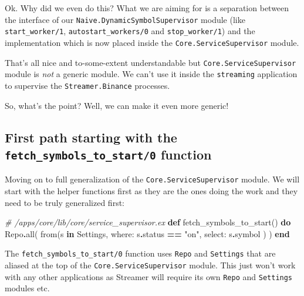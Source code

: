 \documentclass[
]{book}
\newenvironment{Shaded}{\begin{snugshade}}{\end{snugshade}}
\newcommand{\CommentTok}[1]{\textcolor[rgb]{0.56,0.35,0.01}{\textit{#1}}}
\newcommand{\ConstantTok}[1]{\textcolor[rgb]{0.00,0.00,0.00}{#1}}
\newcommand{\KeywordTok}[1]{\textcolor[rgb]{0.13,0.29,0.53}{\textbf{#1}}}
\newcommand{\NormalTok}[1]{#1}
\newcommand{\OperatorTok}[1]{\textcolor[rgb]{0.81,0.36,0.00}{\textbf{#1}}}
\newcommand{\StringTok}[1]{\textcolor[rgb]{0.31,0.60,0.02}{#1}}
\newcommand{\VariableTok}[1]{\textcolor[rgb]{0.00,0.00,0.00}{#1}}
\begin{document}
Ok. Why did we even do this? What we are aiming for is a separation between the interface of our \texttt{Naive.DynamicSymbolSupervisor} module (like \texttt{start\_worker/1}, \texttt{autostart\_workers/0} and \texttt{stop\_worker/1}) and the implementation which is now placed inside the \texttt{Core.ServiceSupervisor} module.

That's all nice and to-some-extent understandable but \texttt{Core.ServiceSupervisor} module is \emph{not} a generic module. We can't use it inside the \texttt{streaming} application to supervise the \texttt{Streamer.Binance} processes.

So, what's the point? Well, we can make it even more generic!

\hypertarget{first-path-starting-with-the-fetch_symbols_to_start0-function}{%
\subsection{\texorpdfstring{First path starting with the \texttt{fetch\_symbols\_to\_start/0} function}{First path starting with the fetch\_symbols\_to\_start/0 function}}\label{first-path-starting-with-the-fetch_symbols_to_start0-function}}

Moving on to full generalization of the \texttt{Core.ServiceSupervisor} module. We will start with the helper functions first as they are the ones doing the work and they need to be truly generalized first:

\begin{Shaded}
\begin{Highlighting}[]
  \CommentTok{\# /apps/core/lib/core/service\_supervisor.ex}
  \KeywordTok{def}\NormalTok{ fetch\_symbols\_to\_start() }\KeywordTok{do}
    \ConstantTok{Repo}\OperatorTok{.}\NormalTok{all(}
\NormalTok{      from(s }\KeywordTok{in} \ConstantTok{Settings}\NormalTok{,}
        \VariableTok{where:}\NormalTok{ s}\OperatorTok{.}\NormalTok{status }\OperatorTok{==} \StringTok{"on"}\NormalTok{,}
        \VariableTok{select:}\NormalTok{ s}\OperatorTok{.}\NormalTok{symbol}
\NormalTok{      )}
\NormalTok{    )}
  \KeywordTok{end}
\end{Highlighting}
\end{Shaded}

The \texttt{fetch\_symbols\_to\_start/0} function uses \texttt{Repo} and \texttt{Settings} that are aliased at the top of the \texttt{Core.ServiceSupervisor} module. This just won't work with any other applications as Streamer will require its own \texttt{Repo} and \texttt{Settings} modules etc.
\end{document}
